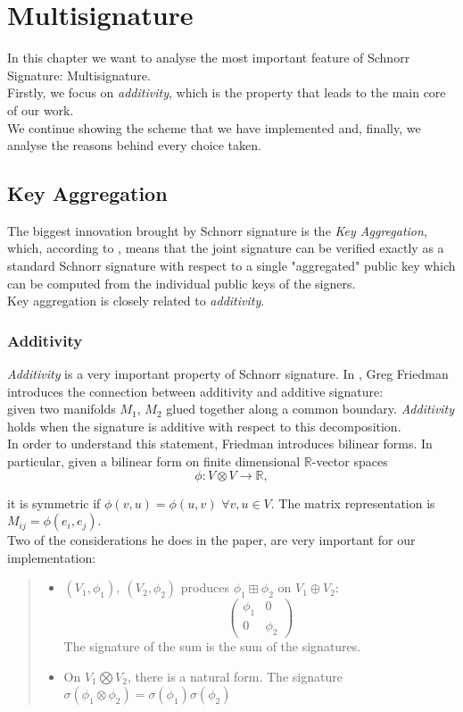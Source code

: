 \chapter{Multisignature}
\label{capitolo4}
In this chapter we want to analyse the most important feature of Schnorr Signature: Multisignature.\\
Firstly, we focus on \textit{additivity}, which is the property that leads to the main core of our work.\\
We continue showing the scheme that we have implemented and, finally, we analyse the reasons behind every choice taken.\\

\section{Key Aggregation}
The biggest innovation brought by Schnorr signature is the \textit{Key Aggregation}, which, according to \cite{MuSig}, means that the joint signature can be verified exactly as a standard Schnorr signature with respect to a single "aggregated" public key which can be computed from the individual public keys of the signers.\\
Key aggregation is closely related to \textit{additivity}.
\subsection{Additivity}
\textit{Additivity} is a very important property of Schnorr signature.
In \cite{NovAdd}, Greg Friedman introduces the connection between additivity and additive signature:\\
given two manifolds $M_{1}$, $M_{2}$ glued together along a common boundary. \textit{Additivity} holds when the signature is additive with respect to this decomposition.\\
In order to understand this statement, Friedman introduces bilinear forms. In particular, given a bilinear form on finite dimensional $\mathbb{R}$-vector spaces
\begin{equation*}
\phi:V \otimes V \to \mathbb{R},
\end{equation*}

it is symmetric if $\phi(v,u)=\phi(u,v)$ $\forall v,u \in V$. The matrix representation is $M_{ij}=\phi (e_{i},e_{j})$.\\
Two of the considerations he does in the paper, are very important for our implementation:
\begin{quote}
	\begin{itemize}
		\item $(V_{1},\phi_{1}),\ (V_{2},\phi_{2})$ produces $\phi_{1} \boxplus \phi_{2}$ on $ V_{1}\oplus V_{2}$:
		\[ 
		\begin{pmatrix}
			 \phi _{1}  & 0\\
			0 &  \phi_{2} 
		\end{pmatrix} 
		\]
		The signature of the sum is the sum of the signatures.
		\item On $V_{1} \bigotimes V_{2}$, there is a natural form. The signature $\sigma(\phi_{1}\otimes \phi_{2})= \sigma(\phi_{1}) \sigma(\phi_{2})$
	\end{itemize}
\end{quote}

